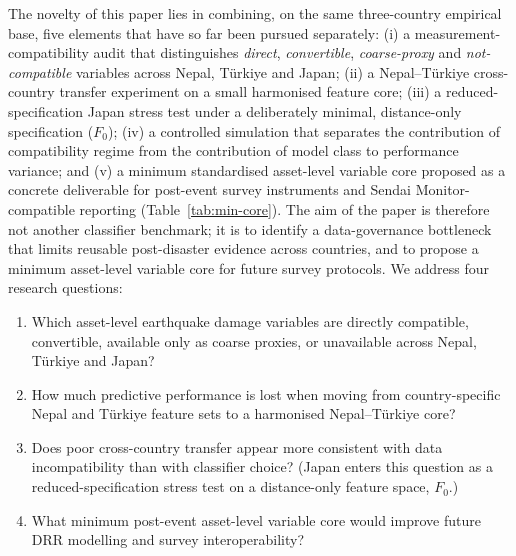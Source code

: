 \documentclass[11pt,a4paper]{article}
\begin{document}
The novelty of this paper lies in combining, on the same three-country empirical base, five elements that have so far been pursued separately: (i) a measurement-compatibility audit that distinguishes \emph{direct}, \emph{convertible}, \emph{coarse-proxy} and \emph{not-compatible} variables across Nepal, T\"urkiye and Japan; (ii) a Nepal--T\"urkiye cross-country transfer experiment on a small harmonised feature core; (iii) a reduced-specification Japan stress test under a deliberately minimal, distance-only specification ($F_0$); (iv) a controlled simulation that separates the contribution of compatibility regime from the contribution of model class to performance variance; and (v) a minimum standardised asset-level variable core proposed as a concrete deliverable for post-event survey instruments and Sendai Monitor-compatible reporting (Table~\ref{tab:min-core}). The aim of the paper is therefore not another classifier benchmark; it is to identify a data-governance bottleneck that limits reusable post-disaster evidence across countries, and to propose a minimum asset-level variable core for future survey protocols. We address four research questions:

\begin{enumerate}[label=(RQ\arabic*),leftmargin=*]
  \item Which asset-level earthquake damage variables are directly
        compatible, convertible, available only as coarse proxies, or
        unavailable across Nepal, T\"urkiye and Japan?
  \item How much predictive performance is lost when moving from
        country-specific Nepal and T\"urkiye feature sets to a
        harmonised Nepal--T\"urkiye core?
  \item Does poor cross-country transfer appear more consistent with
        data incompatibility than with classifier choice? (Japan enters
        this question as a reduced-specification stress test on a
        distance-only feature space, $F_0$.)
  \item What minimum post-event asset-level variable core would improve
        future DRR modelling and survey interoperability?
\end{enumerate}
\end{document}
